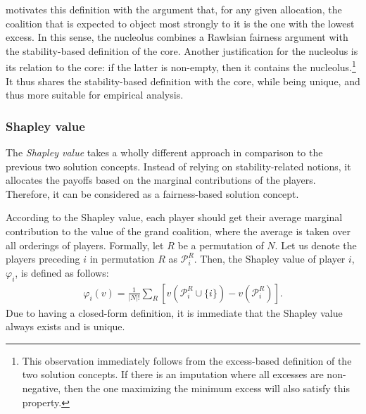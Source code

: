 \documentclass[12pt]{article}
\begin{document}
\textcite{schmeidler1969nucleolus} motivates this definition with the argument that, for any given allocation, the coalition that is expected to object most strongly to it is the one with the lowest excess. In this sense, the nucleolus combines a Rawlsian fairness argument with the stability-based definition of the core. Another justification for the nucleolus is its relation to the core: if the latter is non-empty, then it contains the nucleolus.\footnote{This observation immediately follows from the excess-based definition of the two solution concepts. If there is an imputation where all excesses are non-negative, then the one maximizing the minimum excess will also satisfy this property.} It thus shares the stability-based definition with the core, while being unique, and thus more suitable for empirical analysis.

\subsubsection{Shapley value}

The \emph{Shapley value} \parencite{shapley1953value} takes a wholly different approach in comparison to the previous two solution concepts. Instead of relying on stability-related notions, it allocates the payoffs based on the marginal contributions of the players. Therefore, it can be considered as a fairness-based solution concept.

According to the Shapley value, each player should get their average marginal contribution to the value of the grand coalition, where the average is taken over all orderings of players. Formally, let $R$ be a permutation of $N$. Let us denote the players preceding $i$ in permutation $R$ as $\mathcal{P}_i^R$. Then, the Shapley value of player $i$, $\varphi_i$, is defined as follows:
\begin{align}
    \varphi_i(v) = \frac{1}{|N|!}\sum_R \left[ v(\mathcal{P}_i^R \cup \{i\})  - v(\mathcal{P}_i^R) \right]. \label{eq:shapley_vale}
\end{align}
Due to having a closed-form definition, it is immediate that the Shapley value always exists and is unique.
\end{document}
